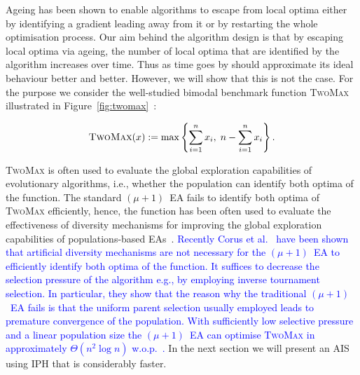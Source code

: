 \documentclass[lettersize,journal]{IEEEtran}
\newcommand{\new}[1]{\textcolor{blue}{#1}}
\begin{document}
 Ageing has been shown to enable algorithms to escape from local optima either by identifying a gradient leading away from it or by restarting the whole optimisation process. Our aim behind the algorithm design is that by escaping local optima via ageing, the number of local optima that are identified by the algorithm increases over time. Thus as time goes by {\expoHD } should approximate its ideal behaviour better and better.
 	However, we will show that this is not the case. For the purpose we consider the well-studied
 	bimodal benchmark function \textsc{TwoMax} %
 	illustrated in Figure~\ref{fig:twomax}~\cite{FriedrichOSWECJ09,SudholtBookChapter2019,OlivetoSudholtZarges2018,CovantesOsunaSudholt2017,CorusLissovoiOlivetoWittTELO2021}:
 	
 	\begin{equation}\label{func:twomax}
 		\textsc{TwoMax}(x):=\max \left\{\sum_{i=1}^n x_i, \; n-\sum_{i=1}^n x_i \right\}.
 	\end{equation} 
 	
 	\textsc{TwoMax} is often used to evaluate the global exploration capabilities of evolutionary algorithms, i.e., whether the population can identify both optima of the function. The standard $(\mu+1)$~EA fails to identify both optima of \textsc{TwoMax} efficiently, hence, the function has been often used to evaluate the effectiveness of diversity mechanisms for improving the global exploration capabilities of populations-based EAs~\cite{FriedrichOSWECJ09,SudholtBookChapter2019,OlivetoSudholtZarges2018,CovantesOsunaSudholt2017}. \new{Recently Corus et al.~\cite{CorusLissovoiOlivetoWittTELO2021} have been shown that artificial diversity mechanisms are not necessary for the $(\mu+1)$~EA to efficiently identify both optima of the function. It suffices to decrease the selection pressure of the algorithm e.g., by employing  inverse tournament selection. In particular, they show that the reason why the traditional $(\mu+1)$~EA fails is that the uniform parent selection usually employed leads to premature convergence of the population.
 	With sufficiently low selective pressure and a linear population size the $(\mu+1)$~EA can optimise  \textsc{TwoMax} in approximately $\Theta(n^2 \log n)$ w.o.p.~\cite{CorusLissovoiOlivetoWittTELO2021}.} In the next section we will present an AIS using IPH that is considerably faster.
 	
\end{document}
